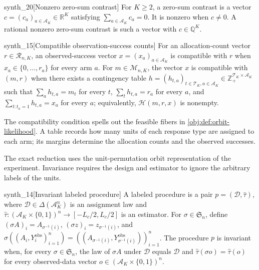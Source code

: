 \documentclass[11pt]{article}
\begin{document}
\begin{definitionv}{synth_20}[Nonzero zero-sum contrast]
For \(K\ge 2\), a zero-sum contrast is a vector \(c=(c_a)_{a\in\mathcal A_K}\in\mathbb R^K\) satisfying \(\sum_{a\in\mathcal A_K}c_a=0\). It is nonzero when \(c\neq 0\). A rational nonzero zero-sum contrast is such a vector with \(c\in\mathbb Q^K\).
\end{definitionv}

\begin{definitionv}{synth_15}[Compatible observation-success counts]
For an allocation-count vector \(r\in\mathcal R_{n,K}\), an observed-success vector \(x=(x_a)_{a\in\mathcal A_K}\) is compatible with \(r\) when \(x_a\in\{0,\ldots,r_a\}\) for every arm \(a\). For \(m\in\mathcal M_{n,K}\), the vector \(x\) is compatible with \((m,r)\) when there exists a contingency table \(h=(h_{t,a})_{t\in\mathcal T_K,a\in\mathcal A_K}\in\mathbb Z_+^{\mathcal T_K\times\mathcal A_K}\) such that \(\sum_a h_{t,a}=m_t\) for every \(t\), \(\sum_t h_{t,a}=r_a\) for every \(a\), and \(\sum_{t:t_a=1}h_{t,a}=x_a\) for every \(a\); equivalently, \(\mathcal H(m,r,x)\) is nonempty.
\end{definitionv}

The compatibility condition spells out the feasible fibers in \cref{obj:def:orbit-likelihood}. A table  records how many units of each response type are assigned to each arm; its margins determine the allocation counts and the observed successes.

The exact reduction uses the unit-permutation orbit representation of the experiment. Invariance requires the design and estimator to ignore the arbitrary labels of the units.

\begin{definitionv}{synth_14}[Invariant labeled procedure]
A labeled procedure is a pair \(p=(\mathcal D,\widehat\tau)\), where \(\mathcal D\in\Delta(\mathcal A_K^n)\) is an assignment law and \(\widehat\tau:(\mathcal A_K\times\{0,1\})^n\to[-L_c/2,L_c/2]\) is an estimator. For \(\sigma\in\mathfrak S_n\), define \((\sigma A)_i=A_{\sigma^{-1}(i)}\), \((\sigma z)_i=z_{\sigma^{-1}(i)}\), and \(\sigma((A_i,Y_i^{\mathrm{obs}})_{i=1}^n)=((A_{\sigma^{-1}(i)},Y_{\sigma^{-1}(i)}^{\mathrm{obs}}))_{i=1}^n\). The procedure \(p\) is invariant when, for every \(\sigma\in\mathfrak S_n\), the law of \(\sigma A\) under \(\mathcal D\) equals \(\mathcal D\) and \(\widehat\tau(\sigma o)=\widehat\tau(o)\) for every observed-data vector \(o\in(\mathcal A_K\times\{0,1\})^n\).
\end{definitionv}
\end{document}
